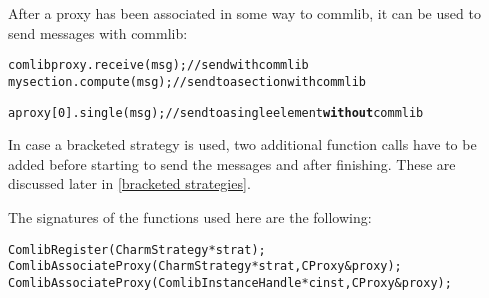 After a proxy has been associated in some way to commlib, it can be used to send
messages with commlib:

\begin{alltt}
  comlibproxy.receive(msg); // send with commlib
  mysection.compute(msg);   // send to a section with commlib

  aproxy[0].single(msg);    // send to a single element {\textbf{without}} commlib
\end{alltt}

In case a bracketed strategy is used, two additional function calls have to
be added before starting to send the messages and after finishing. These are
discussed later in \ref{bracketed strategies}.

The signatures of the functions used here are the following:

\begin{alltt}
ComlibRegister (CharmStrategy *strat);
ComlibAssociateProxy (CharmStrategy *strat, CProxy &proxy);
ComlibAssociateProxy (ComlibInstanceHandle *cinst, CProxy &proxy);
\end{alltt}









